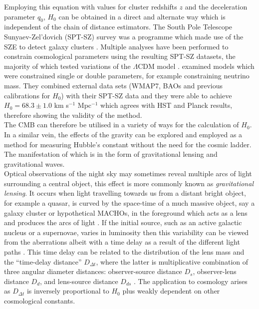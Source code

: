 \documentclass[12pt, onecolumn]{revtex4}    %
\begin{document}
Employing this equation with values for cluster redshifts $z$ and the deceleration parameter $q_0$, $H_0$ can be obtained in a direct and alternate way which is independent of the chain of distance estimators. The South Pole Telescope Sunyaev-Zel'dovich (SPT-SZ) survey was a programme which made use of the SZE to detect galaxy clusters \citep{2009AIPC.1185..475C}. Multiple analyses have been performed to constrain cosmological parameters using the resulting SPT-SZ datasets, the majority of which tested variations of the $\Lambda$CDM model \citep{2014ApJ...782...74H, 2016ApJ...832...95D}. \cite{2014ApJ...782...74H} examined models which were constrained single or double parameters, for example constraining neutrino mass. They combined external data sets (WMAP7, BAOs and previous calibrations for $H_0$) with their SPT-SZ data and they were able to achieve $H_0=68.3\pm1.0$ km s$^{-1}$ Mpc$^{-1}$ which agrees with HST and Planck results, therefore showing the validity of the method. \\


The CMB can therefore be utilised in a variety of ways for the calculation of $H_0$. In a similar vein, the effects of the gravity can be explored and employed as a method for measuring Hubble's constant without the need for the cosmic ladder. The manifestation of which is in the form of gravitational lensing and gravitational waves. \\

Optical observations of the night sky may sometimes reveal multiple arcs of light surrounding a central object, this effect is more commonly known as \textit{gravitational lensing}. It occurs when light travelling towards us from a distant bright object, for example a quasar, is curved by the space-time of a much massive object, say a galaxy cluster or hypothetical MACHOs, in the foreground which acts as a lens and produces the arcs of light \citep{carroll_astro}. If the initial source, such as an active galactic nucleus or a supernovae, varies in luminosity then this variability can be viewed from the aberrations albeit with a time delay as a result of the different light paths \citep{suyu_2017}. This time delay can be related to the distribution of the lens mass and the ``time-delay distance'' $D_{\Delta t}$, where the latter is multiplicative combination of three angular diameter distances: observer-source distance $D_s$, observer-lens distance $D_d$, and lens-source distance $D_{ds}$ \citep{suyu_2017, 2018MNRAS.473..210S}. The application to cosmology arises as $D_{\Delta t}$ is inversely proportional to $H_0$ plus weakly dependent on other cosmological constants. \\
\end{document}
